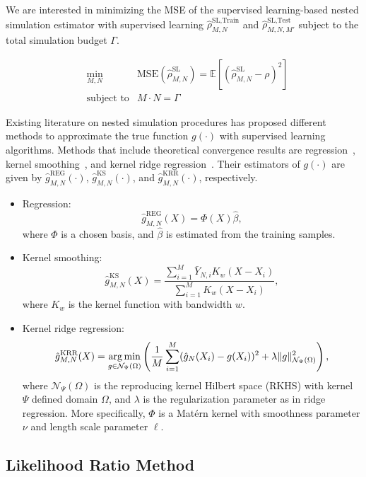 We are interested in minimizing the MSE of the supervised learning-based nested simulation estimator with supervised learning $\hat{\rho}^{\text{SL}, \text{Train}}_{M, N}$ and $\hat{\rho}^{\text{SL}, \text{Test}}_{M, N, M'}$ subject to the total simulation budget $\Gamma$.

\begin{align}
    & \min_{M, N}  & \text{MSE}(\hat{\rho}^{\text{SL}}_{M, N}) = \mathbb{E} \left[ \left( \hat{\rho}^{\text{SL}}_{M, N} - \rho \right)^2 \right] \nonumber \\
    & \text{subject to} & M \cdot N = \Gamma 
\end{align}

Existing literature on nested simulation procedures has proposed different methods to approximate the true function $g(\cdot)$ with supervised learning algorithms. 
Methods that include theoretical convergence results are regression~\citep{broadie2015risk}, kernel smoothing~\citep{hong2017kernel}, and kernel ridge regression~\citep{wang2022smooth}.
Their estimators of $g(\cdot)$ are given by $\hat{g}^{\text{REG}}_{M, N}(\cdot)$, $\hat{g}^{\text{KS}}_{M, N}(\cdot)$, and $\hat{g}^{\text{KRR}}_{M, N}(\cdot)$, respectively.

\begin{itemize}
    \item   Regression:
            $$\hat{g}^{\text{REG}}_{M, N}(X) = \Phi(X) \hat{\beta},$$
            where $\Phi$ is a chosen basis, and $\hat{\beta}$ is estimated from the training samples.
    \item   Kernel smoothing:
            $$\hat{g}^{\text{KS}}_{M, N}(X) = \frac{\sum_{i=1}^M \bar{Y}_{N, i} K_w(X - X_i)}{\sum_{i=1}^M K_w(X - X_i)}, $$
            where $K_w$ is the kernel function with bandwidth $w$.
    \item   Kernel ridge regression:
            $$\hat{g}^{\text{KRR}}_{M, N}(X) = \operatorname*{arg\,min}_{g \in \mathcal{N}_{\Psi}(\Omega)} \left( \frac{1}{M} \sum_{i=1}^M (\hat{g}_N(X_i) - g(X_i))^2 + \lambda \|g\|_{\mathcal{N}_{\Psi}(\Omega)}^2\right),$$
            where $\mathcal{N}_{\Psi}(\Omega)$ is the reproducing kernel Hilbert space (RKHS) with kernel $\Psi$ defined domain $\Omega$, and $\lambda$ is the regularization parameter as in ridge regression. 
            More specifically, $\Phi$ is a Mat\'ern kernel with smoothness parameter $\nu$ and length scale parameter $\ell$.
\end{itemize}

\subsection{Likelihood Ratio Method}

